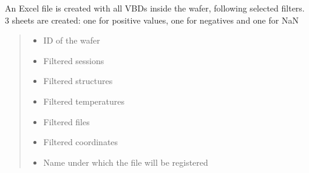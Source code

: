 \documentclass[letterpaper,10pt,english]{sphinxmanual}
\begin{document}
\begin{fulllineitems}
\label{\detokenize{excel:excel.excel_VBD}}
\pysigstartsignatures
{}
\pysigstopsignatures
\sphinxAtStartPar
An Excel file is created with all VBDs inside the wafer, following selected filters.
3 sheets are created: one for positive values, one for negatives and one for NaN
\begin{quote}\begin{description}
\begin{itemize}
\item {} 
\sphinxAtStartPar
{} \textendash{} ID of the wafer

\item {} 
\sphinxAtStartPar
{} \textendash{} Filtered sessions

\item {} 
\sphinxAtStartPar
{} \textendash{} Filtered structures

\item {} 
\sphinxAtStartPar
{} \textendash{} Filtered temperatures

\item {} 
\sphinxAtStartPar
{} \textendash{} Filtered files

\item {} 
\sphinxAtStartPar
{} \textendash{} Filtered coordinates

\item {} 
\sphinxAtStartPar
{} \textendash{} Name under which the file will be registered

\end{itemize}

\end{description}\end{quote}

\end{fulllineitems}
\end{document}

